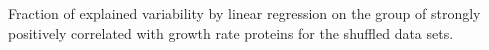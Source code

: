 Fraction of explained variability by linear regression on the group of strongly positively correlated with growth rate proteins for the shuffled data sets.
